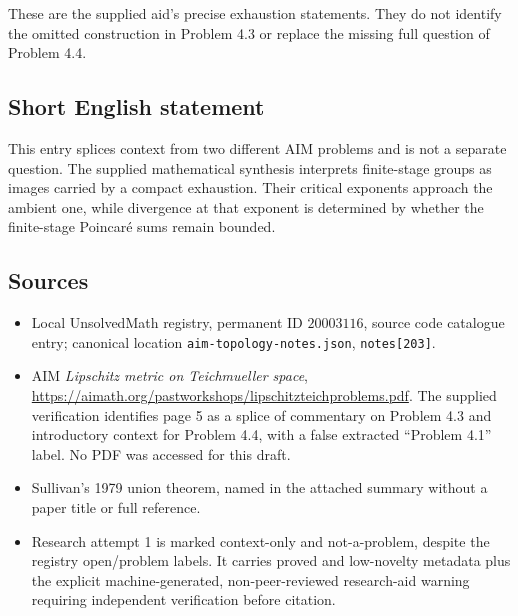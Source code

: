 \documentclass[11pt]{article}
\begin{document}
These are the supplied aid's precise exhaustion statements. They do not identify the omitted construction in Problem 4.3 or replace the missing full question of Problem 4.4.
\subsection{Short English statement}
This entry splices context from two different AIM problems and is not a separate question. The supplied mathematical synthesis interprets finite-stage groups as images carried by a compact exhaustion. Their critical exponents approach the ambient one, while divergence at that exponent is determined by whether the finite-stage Poincar\'e sums remain bounded.
\subsection{Sources}
\begin{itemize}
\item Local UnsolvedMath registry, permanent ID $20003116$, source code catalogue entry; canonical location \texttt{aim-topology-notes.json}, \texttt{notes[203]}.
\item AIM \emph{Lipschitz metric on Teichmueller space}, \url{https://aimath.org/pastworkshops/lipschitzteichproblems.pdf}. The supplied verification identifies page 5 as a splice of commentary on Problem 4.3 and introductory context for Problem 4.4, with a false extracted ``Problem 4.1'' label. No PDF was accessed for this draft.
\item Sullivan's 1979 union theorem, named in the attached summary without a paper title or full reference.
\item Research attempt 1 is marked context-only and not-a-problem, despite the registry open/problem labels. It carries proved and low-novelty metadata plus the explicit machine-generated, non-peer-reviewed research-aid warning requiring independent verification before citation.
\end{itemize}
\end{document}
